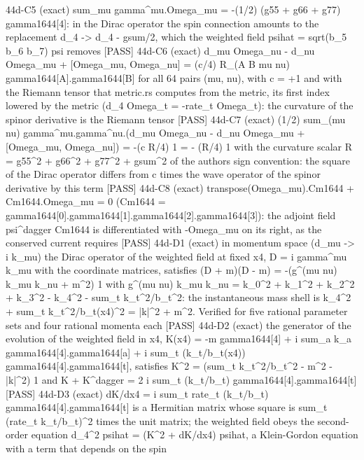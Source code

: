 \documentclass[
  10pt,
]{article}
\newenvironment{Shaded}{}{}
\newcommand{\NormalTok}[1]{#1}
\begin{document}
\begin{Shaded}
\begin{Highlighting}[]
\NormalTok{[PASS] 44d{-}C5  (exact) sum\_mu gamma\^{}mu.Omega\_mu = {-}(1/2) (g55 + g66 + g77) gamma1644[4]: in the Dirac operator the spin connection amounts to the replacement d\_4 {-}\textgreater{} d\_4 {-} gsum/2, which the weighted field psihat = sqrt(b\_5 b\_6 b\_7) psi removes}
\NormalTok{[PASS] 44d{-}C6  (exact) d\_mu Omega\_nu {-} d\_nu Omega\_mu + [Omega\_mu, Omega\_nu] = (c/4) R\_(A B mu nu) gamma1644[A].gamma1644[B] for all 64 pairs (mu, nu), with c = +1 and with the Riemann tensor that metric.rs computes from the metric, its first index lowered by the metric (d\_4 Omega\_t = {-}rate\_t Omega\_t): the curvature of the spinor derivative is the Riemann tensor}
\NormalTok{[PASS] 44d{-}C7  (exact) (1/2) sum\_(mu nu) gamma\^{}mu.gamma\^{}nu.(d\_mu Omega\_nu {-} d\_nu Omega\_mu + [Omega\_mu, Omega\_nu]) = {-}(c R/4) 1 = {-} (R/4) 1 with the curvature scalar R = g55\^{}2 + g66\^{}2 + g77\^{}2 + gsum\^{}2 of the author\textquotesingle{}s sign convention: the square of the Dirac operator differs from c times the wave operator of the spinor derivative by this term}
\NormalTok{[PASS] 44d{-}C8  (exact) transpose(Omega\_mu).Cm1644 + Cm1644.Omega\_mu = 0 (Cm1644 = gamma1644[0].gamma1644[1].gamma1644[2].gamma1644[3]): the adjoint field psi\^{}dagger Cm1644 is differentiated with {-}Omega\_mu on its right, as the conserved current requires}
\NormalTok{[PASS] 44d{-}D1  (exact) in momentum space (d\_mu {-}\textgreater{} i k\_mu) the Dirac operator of the weighted field at fixed x4, D = i gamma\^{}mu k\_mu with the coordinate matrices, satisfies (D + m)(D {-} m) = {-}(g\^{}(mu nu) k\_mu k\_nu + m\^{}2) 1 with g\^{}(mu nu) k\_mu k\_nu = k\_0\^{}2 + k\_1\^{}2 + k\_2\^{}2 + k\_3\^{}2 {-} k\_4\^{}2 {-} sum\_t k\_t\^{}2/b\_t\^{}2: the instantaneous mass shell is k\_4\^{}2 + sum\_t k\_t\^{}2/b\_t(x4)\^{}2 = |k|\^{}2 + m\^{}2. Verified for five rational parameter sets and four rational momenta each}
\NormalTok{[PASS] 44d{-}D2  (exact) the generator of the evolution of the weighted field in x4, K(x4) = {-}m gamma1644[4] + i sum\_a k\_a gamma1644[4].gamma1644[a] + i sum\_t (k\_t/b\_t(x4)) gamma1644[4].gamma1644[t], satisfies K\^{}2 = (sum\_t k\_t\^{}2/b\_t\^{}2 {-} m\^{}2 {-} |k|\^{}2) 1 and K + K\^{}dagger = 2 i sum\_t (k\_t/b\_t) gamma1644[4].gamma1644[t]}
\NormalTok{[PASS] 44d{-}D3  (exact) dK/dx4 = i sum\_t rate\_t (k\_t/b\_t) gamma1644[4].gamma1644[t] is a Hermitian matrix whose square is sum\_t (rate\_t k\_t/b\_t)\^{}2 times the unit matrix; the weighted field obeys the second{-}order equation d\_4\^{}2 psihat = (K\^{}2 + dK/dx4) psihat, a Klein{-}Gordon equation with a term that depends on the spin}

\end{Highlighting}
\end{Shaded}
\end{document}
